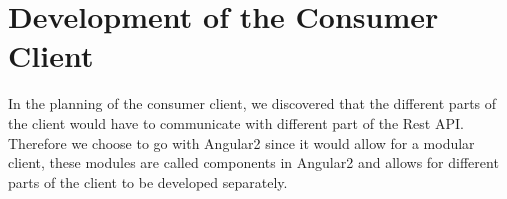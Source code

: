 \section{Development of the Consumer Client}\label{sec:DevelopmentConsumerClient}
In the planning of the consumer client, we discovered that the different parts of the client would have to communicate with different part of the Rest API.
Therefore we choose to go with Angular2 since it would allow for a modular client, these modules are called components in Angular2 and allows for different parts of the client to be developed separately.
